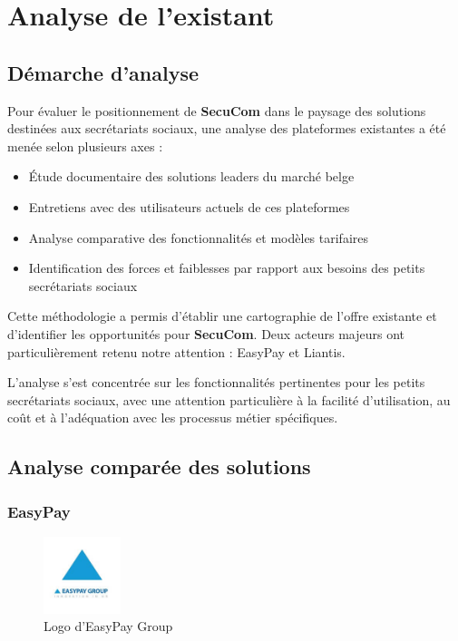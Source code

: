 \chapter{Analyse de l'existant}

\section{Démarche d'analyse}

\noindent Pour évaluer le positionnement de \textbf{SecuCom} dans le paysage des solutions destinées aux secrétariats sociaux, une analyse des plateformes existantes a été menée selon plusieurs axes :

\begin{itemize}[leftmargin=*,label=\textcolor{darkgray}{$\bullet$},itemsep=0.3em]
  \item Étude documentaire des solutions leaders du marché belge
  \item Entretiens avec des utilisateurs actuels de ces plateformes
  \item Analyse comparative des fonctionnalités et modèles tarifaires
  \item Identification des forces et faiblesses par rapport aux besoins des petits secrétariats sociaux
\end{itemize}

\noindent Cette méthodologie a permis d'établir une cartographie de l'offre existante et d'identifier les opportunités pour \textbf{SecuCom}. Deux acteurs majeurs ont particulièrement retenu notre attention : EasyPay et Liantis.

\begin{note}
L'analyse s'est concentrée sur les fonctionnalités pertinentes pour les petits secrétariats sociaux, avec une attention particulière à la facilité d'utilisation, au coût et à l'adéquation avec les processus métier spécifiques.
\end{note}

\section{Analyse comparée des solutions}

\subsection{EasyPay}

\begin{figure}[H]
    \centering
    \includegraphics[width=0.2\textwidth]{easyPayLogo.jpeg}
    \caption{Logo d'EasyPay Group \cite{easypay}}
    \label{fig:easyPayLogo}
\end{figure}

